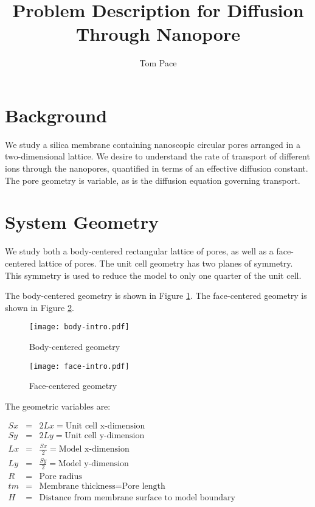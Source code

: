 \documentclass{article}
\begin{document}
\title{Problem Description for Diffusion Through Nanopore}
\author{Tom Pace}
\maketitle

\section{Background}\label{sec:background}

We study a silica membrane containing nanoscopic circular pores arranged in a two-dimensional lattice.
We desire to understand the rate of transport of different ions through the nanopores,
quantified in terms of an effective diffusion constant.
The pore geometry is variable, as is the diffusion equation governing transport.

\section{System Geometry}\label{sec:geometry}

We study both a body-centered rectangular lattice of pores,
as well as a face-centered lattice of pores.
The unit cell geometry has two planes of symmetry.
This symmetry is used to reduce the model to only one quarter of the unit cell.

The body-centered geometry is shown in Figure \ref{fig:body-intro}.
The face-centered geometry is shown in Figure \ref{fig:face-intro}.

\begin{figure}[H]
\centering
\texttt{[image: body-intro.pdf]}
\caption{Body-centered geometry}
\label{fig:body-intro}
\end{figure}

\begin{figure}[H]
\centering
\texttt{[image: face-intro.pdf]}
\caption{Face-centered geometry}
\label{fig:face-intro}
\end{figure}

The geometric variables are:

$\begin{array}{rcl}
Sx & = & 2 Lx =\text{Unit cell x-dimension} \\
Sy & = & 2 Ly =\text{Unit cell y-dimension} \\
Lx & = & \frac{Sx}{2} =\text{Model x-dimension} \\
Ly & = & \frac{Sy}{2} =\text{Model y-dimension} \\
R & = & \text{Pore radius} \\
tm & = & \text{Membrane thickness} = \text{Pore length} \\
H & = & \text{Distance from membrane surface to model boundary}
\end{array}$
\end{document}
